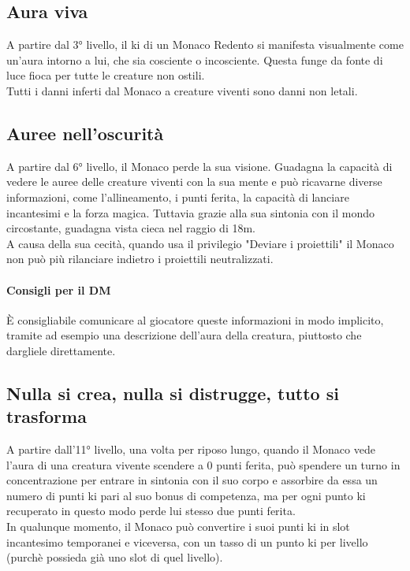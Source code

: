 \subsection{Aura viva}

A partire dal 3° livello, il ki di un Monaco Redento si manifesta visualmente come un'aura intorno a lui, che sia cosciente o incosciente. Questa funge da fonte di luce fioca per tutte le creature non ostili. \\ Tutti i danni inferti dal Monaco a creature viventi sono danni non letali.

\subsection{Auree nell'oscurità}

A partire dal 6° livello, il Monaco perde la sua visione. Guadagna la capacità di vedere le auree delle creature viventi con la sua mente e può ricavarne diverse informazioni, come l'allineamento, i punti ferita, la capacità di lanciare incantesimi e la forza magica. Tuttavia grazie alla sua sintonia con il mondo circostante, guadagna vista cieca nel raggio di 18m. \\ A causa della sua cecità, quando usa il privilegio "Deviare i proiettili" il Monaco non può più rilanciare indietro i proiettili neutralizzati.
\paragraph{Consigli per il DM}È consigliabile comunicare al giocatore queste informazioni in modo implicito, tramite ad esempio una descrizione dell'aura della creatura, piuttosto che dargliele direttamente.

\subsection{Nulla si crea, nulla si distrugge, tutto si trasforma}

A partire dall'11° livello, una volta per riposo lungo, quando il Monaco vede l'aura di una creatura vivente scendere a 0 punti ferita, può spendere un turno in concentrazione per entrare in sintonia con il suo corpo e assorbire da essa un numero di punti ki pari al suo bonus di competenza, ma per ogni punto ki recuperato in questo modo perde lui stesso due punti ferita. \\ In qualunque momento, il Monaco può convertire i suoi punti ki in slot incantesimo temporanei e viceversa, con un tasso di un punto ki per livello (purchè possieda già uno slot di quel livello).


